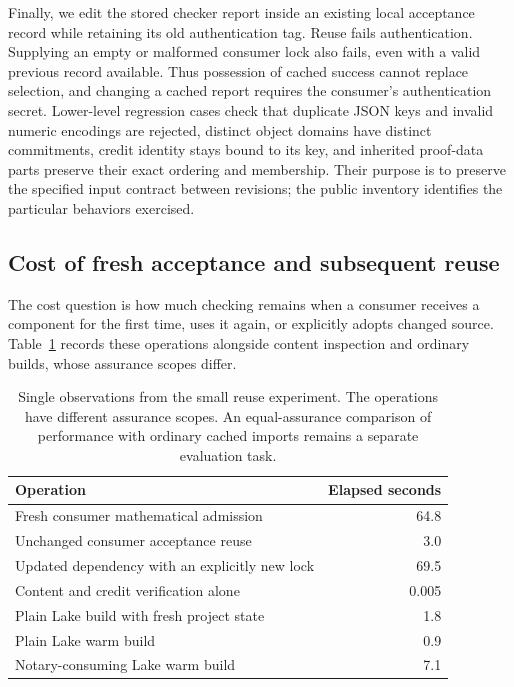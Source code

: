\documentclass[11pt]{article}
\begin{document}
Finally, we edit the stored checker report inside an existing local acceptance
record while retaining its old authentication tag. Reuse fails authentication.
Supplying an empty or malformed consumer lock also fails, even with a valid
previous record available. Thus possession of cached success cannot replace
selection, and changing a cached report requires the consumer's authentication
secret. Lower-level regression cases check that duplicate JSON keys and invalid
numeric encodings are rejected, distinct object domains have distinct
commitments, credit identity stays bound to its key, and inherited proof-data
parts preserve their exact ordering and membership. Their purpose is to preserve
the specified input contract between revisions; the public inventory identifies
the particular behaviors exercised.

\subsection{Cost of fresh acceptance and subsequent reuse}

The cost question is how much checking remains when a consumer receives a
component for the first time, uses it again, or explicitly adopts changed source.
Table~\ref{tab:cost} records these operations alongside content inspection and
ordinary builds, whose assurance scopes differ.

\begin{table}[ht]
\centering\small
\begin{tabularx}{\linewidth}{@{}Xr@{}}
\toprule
Operation & Elapsed seconds\\
\midrule
Fresh consumer mathematical admission & 64.8\\
Unchanged consumer acceptance reuse & 3.0\\
Updated dependency with an explicitly new lock & 69.5\\
Content and credit verification alone & 0.005\\
Plain Lake build with fresh project state & 1.8\\
Plain Lake warm build & 0.9\\
Notary-consuming Lake warm build & 7.1\\
\bottomrule
\end{tabularx}
\caption{Single observations from the small reuse experiment. The operations
have different assurance scopes. An equal-assurance comparison of performance
with ordinary cached imports remains a separate evaluation task.}
\label{tab:cost}
\end{table}
\end{document}
